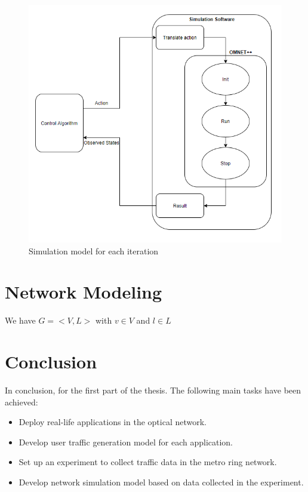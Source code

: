 \documentclass[conference]{IEEEtran}
\begin{document}
\begin{figure}[]
    \centering
        \includegraphics[scale = 0.5]{imgs/Simulation_software.png}
        \caption{Simulation model for each iteration}
        \label{fig:simulation_software}
    \end{figure}


\section{Network Modeling}
\label{sec:Network Modeling}

We have $G = <V,L>$ with $ v \in V$ and $ l \in L $ 


\section{Conclusion}
\label{sec:Conclusion}

In conclusion, for the first part of the thesis. The following main tasks have been achieved: 
\begin{itemize}
    \item Deploy real-life applications in the optical network.
    \item Develop user traffic generation model for each application.
    \item Set up an experiment to collect traffic data in the metro ring network.
    \item Develop network simulation model based on data collected in the experiment.
\end{itemize}
\end{document}
